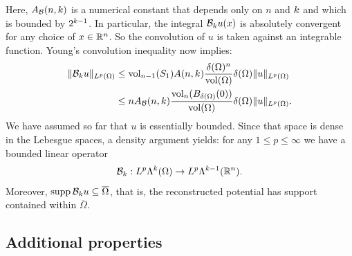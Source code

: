 \documentclass[10pt,letterpaper]{article}
\begin{document}
Here, $A_{{\mathcal B}}(n,k)$ is a numerical constant that depends only on $n$ and $k$ 
and which is bounded by $2^{k-1}$. 
In particular, the integral ${\mathcal B}_{k} u(x)$ is absolutely convergent for any choice of $x \in {\mathbb R}^{n}$. 
So the convolution of $u$ is taken against an integrable function. 
Young's convolution inequality now implies: 
\begin{align*}
    \| {\mathcal B}_{k} u \|_{L^{p}(\Omega)}
    &
    \leq 
    \operatorname{vol}_{n-1}(S_1) A(n,k) \frac{ {\delta}(\Omega)^{n} }{\operatorname{vol}(\Omega)} 
    {\delta}(\Omega)
    \| u \|_{L^{p}(\Omega)}
    \\&
    \leq 
    n A_{{\mathcal B}}(n,k) \frac{ \operatorname{vol}_{n}(B_{{\delta}(\Omega)}(0)) }{\operatorname{vol}(\Omega)} 
    {\delta}(\Omega)
    \| u \|_{L^{p}(\Omega)}
    .
\end{align*}
We have assumed so far that $u$ is essentially bounded.
Since that space is dense in the Lebesgue spaces, a density argument yields: 
for any $1 \leq p \leq \infty$ we have a bounded linear operator 
\begin{gather*}
    {\mathcal B}_{k} : L^{p}\Lambda^{k}(\Omega) \rightarrow L^{p}\Lambda^{k-1}({\mathbb R}^n).
\end{gather*}
Moreover, $\operatorname{supp} {\mathcal B}_{k} u \subseteq \overline\Omega$,
that is, the reconstructed potential has support contained within $\overline\Omega$. 
\\





\subsection{Additional properties}
\end{document}
